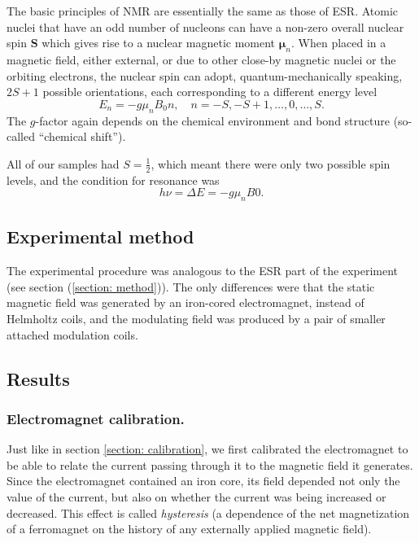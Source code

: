 \documentclass[a4paper]{jpconf}
\numberwithin{equation}{section}
\begin{document}
The basic principles of NMR are essentially the same as those of ESR. Atomic nuclei that have an odd number of nucleons can have a non-zero overall nuclear spin $\mathbf{S}$ which gives rise to a nuclear magnetic moment $\bm{\mu}_n$. When placed in a magnetic field, either external, or due to other close-by magnetic nuclei or the orbiting electrons, the nuclear spin can adopt, quantum-mechanically speaking, $2S + 1$ possible orientations, each corresponding to a different energy level
\[
	E_n = -g \mu_n B_0 n, \quad n = -S, -S+1, \dots, 0, \dots, S. 
\] 
The $g$-factor again depends on the chemical environment and bond structure (so-called ``chemical shift''). 

All of our samples had $S = \tfrac{1}{2}$, which meant there were only two possible spin levels, and the condition for resonance was 
\begin{equation}\label{eqn: NMR resonance condition}
	h\nu = \Delta E = -g \mu_n B0.
\end{equation}


\subsection{Experimental method}
The experimental procedure was analogous to the ESR part of the experiment (see section (\ref{section: method})). The only differences were that the static magnetic field was generated by an iron-cored electromagnet, instead of Helmholtz coils, and the modulating field was produced by a pair of smaller attached modulation coils.


\subsection{Results}
\subsubsection{Electromagnet calibration.}
Just like in section \ref{section: calibration}, we first calibrated the electromagnet to be able to relate the current passing through it to the magnetic field it generates. Since the electromagnet contained an iron core, its field depended not only the value of the current, but also on whether the current was being increased or decreased. This effect is called \emph{hysteresis} (a dependence of the net magnetization of a ferromagnet on the history of any externally applied magnetic field). 
\end{document}
